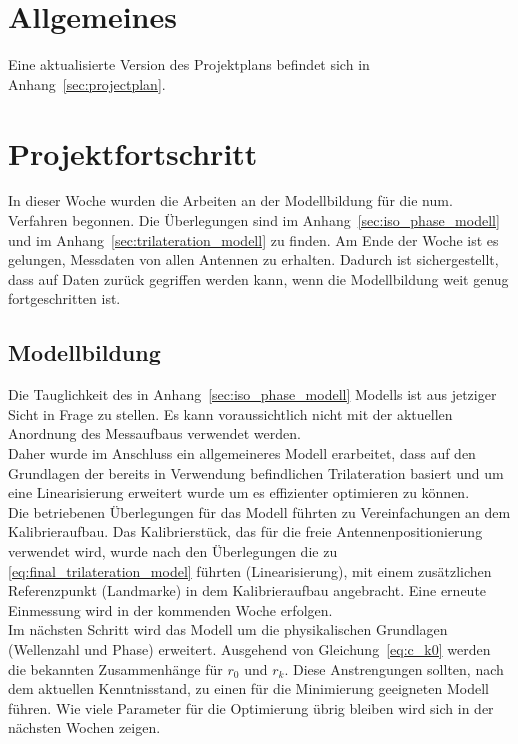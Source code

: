 \documentclass[a4paper,12pt,fleqn]{article}
\begin{document}
\setlength{\headheight}{36pt}

\begin{titlepage}



\end{titlepage}

\section[Allgemeines]{Allgemeines}
Eine aktualisierte Version des Projektplans befindet sich in Anhang~\ref{sec:projectplan}.

\section[Fortschritt]{Projektfortschritt}
In dieser Woche wurden die Arbeiten an der Modellbildung für die num. Verfahren begonnen. Die Überlegungen sind im Anhang~\ref{sec:iso_phase_modell} und im Anhang~\ref{sec:trilateration_modell} zu finden.
Am Ende der Woche ist es gelungen, Messdaten von allen Antennen zu erhalten. Dadurch ist sichergestellt, dass auf Daten zurück gegriffen werden kann, wenn die Modellbildung weit genug fortgeschritten ist. 

\subsection{Modellbildung}
Die Tauglichkeit des in Anhang~\ref{sec:iso_phase_modell} Modells ist aus jetziger Sicht in Frage zu stellen. Es kann voraussichtlich nicht mit der aktuellen Anordnung des Messaufbaus verwendet werden.\\
Daher wurde im Anschluss ein allgemeineres Modell erarbeitet, dass auf den Grundlagen der bereits in Verwendung befindlichen Trilateration basiert und um eine Linearisierung erweitert wurde um es effizienter optimieren zu können.\\
Die betriebenen Überlegungen für das Modell führten zu Vereinfachungen an dem Kalibrieraufbau. Das Kalibrierstück, das für die freie Antennenpositionierung verwendet wird, wurde nach den Überlegungen die zu \eqref{eq:final_trilateration_model}  führten (Linearisierung), mit einem zusätzlichen Referenzpunkt (Landmarke) in dem Kalibrieraufbau angebracht. Eine erneute Einmessung wird in der kommenden Woche erfolgen.\\
Im nächsten Schritt wird das Modell um die physikalischen Grundlagen (Wellenzahl und Phase) erweitert. Ausgehend von Gleichung~\eqref{eq:c_k0} werden die bekannten Zusammenhänge für $r_0$ und $r_k$. Diese Anstrengungen sollten, nach dem aktuellen Kenntnisstand, zu einen für die Minimierung geeigneten Modell führen. Wie viele Parameter für die Optimierung übrig bleiben wird sich in der nächsten Wochen zeigen.
\end{document}
